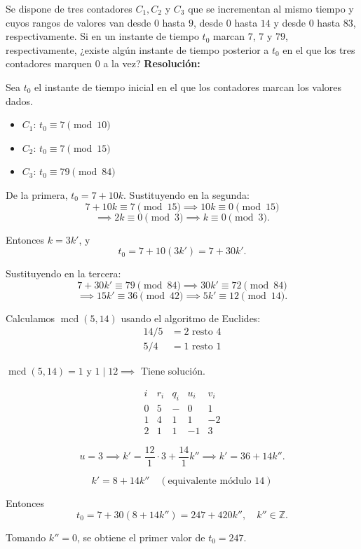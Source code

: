 \documentclass[a4paper,12pt]{article}
\begin{document}
\begin{ejercicio}[title=Ejercicio 41]
Se dispone de tres contadores $C_1, C_2$ y $C_3$ que se incrementan al mismo tiempo y cuyos rangos de valores van desde $0$ hasta $9$, desde $0$ hasta $14$ y desde $0$ hasta $83$, respectivamente.
Si en un instante de tiempo $t_0$ marcan $7$, $7$ y $79$, respectivamente,
¿existe algún instante de tiempo posterior a $t_0$ en el que los tres contadores marquen $0$ a la vez?
\tcblower
\textbf{Resolución:}

Sea $t_0$ el instante de tiempo inicial en el que los contadores marcan los valores dados.  
\begin{itemize}
    \item $C_1$: $t_0 \equiv 7 \pmod{10}$  
    \item $C_2$: $t_0 \equiv 7 \pmod{15}$  
    \item $C_3$: $t_0 \equiv 79 \pmod{84}$  
\end{itemize}

De la primera, $t_0 = 7 + 10 k$. Sustituyendo en la segunda:
\[
7 + 10 k \equiv 7 \pmod{15} \implies 10 k \equiv 0 \pmod{15}
\]
\[
\implies 2 k \equiv 0 \pmod{3} \implies k \equiv 0 \pmod{3}.
\]

Entonces $k = 3 k'$, y
\[
t_0 = 7 + 10 (3 k') = 7 + 30 k'.
\]

Sustituyendo en la tercera:
\[
7 + 30 k' \equiv 79 \pmod{84} \implies 30 k' \equiv 72 \pmod{84}
\]
\[
\implies 15 k' \equiv 36 \pmod{42} \implies 5 k' \equiv 12 \pmod{14}.
\]

Calculamos \(\operatorname{mcd}(5,14)\) usando el algoritmo de Euclides:
\begin{align*}
14 / 5 &= 2 \text{ resto } 4 \\
5 / 4  &= 1 \text{ resto } \boxed{1}
\end{align*}

\(\operatorname{mcd}(5,14) = 1\) y $1 \mid 12 \implies$ Tiene solución.

\[
\begin{array}{c|c|c|c|c}
i & r_i & q_i & u_i & v_i \\
\hline
0 & 5 & - & 0 & 1 \\
1 & 4 & 1 & 1 & -2 \\
2 & \boxed{1} & 1 & -1 & 3
\end{array}
\]

\[
u = 3 \implies k' = \frac{12}{1} \cdot 3 + \frac{14}{1} k'' \implies k' = 36 + 14 k''.
\]

\[
k' = 8 + 14 k'' \quad (\text{equivalente módulo } 14)
\]

Entonces
\[
t_0 = 7 + 30 (8 + 14 k'') = 247 + 420 k'', \quad k'' \in \mathbb{Z}.
\]

Tomando $k'' = 0$, se obtiene el primer valor de $t_0 = 247$.

\end{ejercicio}
\end{document}
